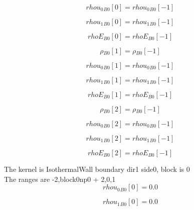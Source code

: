 \documentclass{article}
\begin{document}
\begin{dmath}{rhou_{0}{_{B0}}}[{0}] = {rhou_{0}{_{B0}}}[{-1}]\end{dmath}

\begin{dmath}{rhou_{1}{_{B0}}}[{0}] = {rhou_{1}{_{B0}}}[{-1}]\end{dmath}

\begin{dmath}{rhoE{_{B0}}}[{0}] = {rhoE{_{B0}}}[{-1}]\end{dmath}

\begin{dmath}{\rho{_{B0}}}[{1}] = {\rho{_{B0}}}[{-1}]\end{dmath}

\begin{dmath}{rhou_{0}{_{B0}}}[{1}] = {rhou_{0}{_{B0}}}[{-1}]\end{dmath}

\begin{dmath}{rhou_{1}{_{B0}}}[{1}] = {rhou_{1}{_{B0}}}[{-1}]\end{dmath}

\begin{dmath}{rhoE{_{B0}}}[{1}] = {rhoE{_{B0}}}[{-1}]\end{dmath}

\begin{dmath}{\rho{_{B0}}}[{2}] = {\rho{_{B0}}}[{-1}]\end{dmath}

\begin{dmath}{rhou_{0}{_{B0}}}[{2}] = {rhou_{0}{_{B0}}}[{-1}]\end{dmath}

\begin{dmath}{rhou_{1}{_{B0}}}[{2}] = {rhou_{1}{_{B0}}}[{-1}]\end{dmath}

\begin{dmath}{rhoE{_{B0}}}[{2}] = {rhoE{_{B0}}}[{-1}]\end{dmath}

\noindent The kernel is IsothermalWall boundary dir1 side0, block is 0\\\noindent The ranges are -2,block0np0 + 2,0,1\\\begin{dmath}{rhou_{0}{_{B0}}}[{0}] = 0.0\end{dmath}

\begin{dmath}{rhou_{1}{_{B0}}}[{0}] = 0.0\end{dmath}
\end{document}
